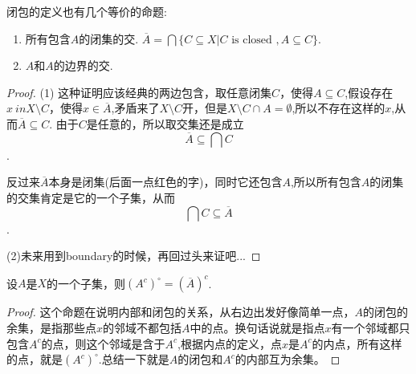 \begin{proposition}
闭包的定义也有几个等价的命题:
	\begin{enumerate}
		\item 所有包含$A$的闭集的交. $\overline A = \bigcap\{C \subseteq X | C \text{ is closed }, A
\subseteq C\}.$
		\item $A$和$A$的边界的交.
	\end{enumerate}
\end{proposition}

\begin{proof}
(1) 这种证明应该经典的两边包含，取任意闭集$C$，使得$A \subseteq C$,假设存在$x \ in X \setminus C$，使得$x \in \overline{A}$,矛盾来了$X \setminus C$开，但是$X \setminus C \cap A = \emptyset$,所以不存在这样的$x$,从而$\overline{A} \subseteq C$. 由于$C$是任意的，所以取交集还是成立\[\overline{A} \subseteq \bigcap C\].

反过来$\overline{A}$本身是闭集(后面一点红色的字)，同时它还包含$A$,所以所有包含$A$的闭集的交集肯定是它的一个子集，从而\[\bigcap C \subseteq \overline{A}\].

(2)未来用到boundary的时候，再回过头来证吧...
\end{proof}




\begin{proposition}
设$A$是$X$的一个子集，则$(A^{c})^{\circ}=(\overline{A})^c$.
\end{proposition}

\begin{proof}
这个命题在说明内部和闭包的关系，从右边出发好像简单一点，$A$的闭包的余集，是指那些点$x$的邻域不都包括$A$中的点。换句话说就是指点$x$有一个邻域都只包含$A^c$的点，则这个邻域是含于$A^c$,根据内点的定义，点$x$是$A^c$的内点，所有这样的点，就是$(A^c)^{\circ}$.总结一下就是$A$的闭包和$A^c$的内部互为余集。	
\end{proof}

